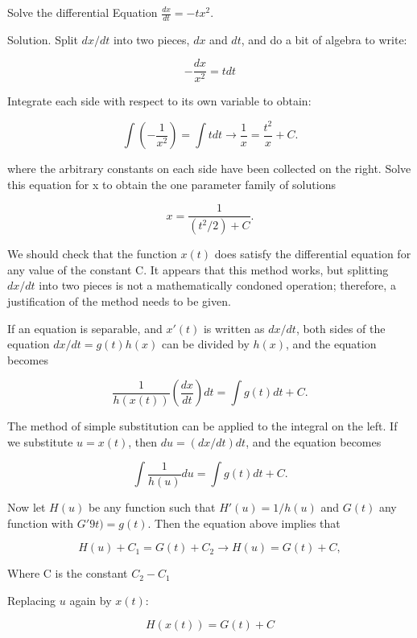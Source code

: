   \begin{problem}
    Solve the differential Equation $\frac{dx}{dt}=-tx^2$.

    Solution. Split $dx/dt$ into two pieces, $dx$ and $dt$, and do a bit of algebra to write:

    \begin{equation}
      - \frac{dx}{x^2} = tdt
    \end{equation}

    Integrate each side with respect to its own variable to obtain:

    \begin{equation}
      \int \left( - \frac{1}{x^2}\right) =\int tdt\to \frac{1}{x} = \frac{t^2}{x} + C.
    \end{equation}

    where the arbitrary constants on each side have been collected on the right. Solve this equation for x to obtain the one parameter family of solutions

    \begin{equation}
      x=\frac{1}{(t^2/2)+C}.
    \end{equation}

    We should check that the function $x(t)$ does satisfy the differential equation for any value of the constant C. It appears that this method works, but splitting $dx/dt$ into two pieces is not a mathematically condoned operation; therefore, a justification of the method needs to be given.

    If an equation is separable, and $x'(t)$ is written as $dx/dt$, both sides of the equation $dx/dt=g(t)h(x)$ can be divided by $h(x)$, and the equation becomes

    \begin{equation}
      \frac{1}{h(x(t))}\left(\frac{dx}{dt}\right)dt=\int g(t)dt+C.
    \end{equation}

    The method of simple substitution can be applied to the integral on the left. If we substitute $u=x(t)$, then $du=(dx/dt)dt$, and the equation becomes

    \begin{equation}
      \int\frac{1}{h(u)}du=\int g(t)dt+C.
    \end{equation}

    Now let $H(u)$ be any function such that $H'(u)=1/h(u)$ and $G(t)$ any function with $G'9t)=g(t)$. Then the equation above implies that

    \begin{equation}
      H(u)+C_1=G(t)+C_2\to H(u)=G(t)+C,
    \end{equation}

    Where C is the constant $C_2-C_1$

    Replacing $u$ again by $x(t)$:

    \begin{equation}
      H(x(t))=G(t)+ C
    \end{equation}
  \end{problem}

